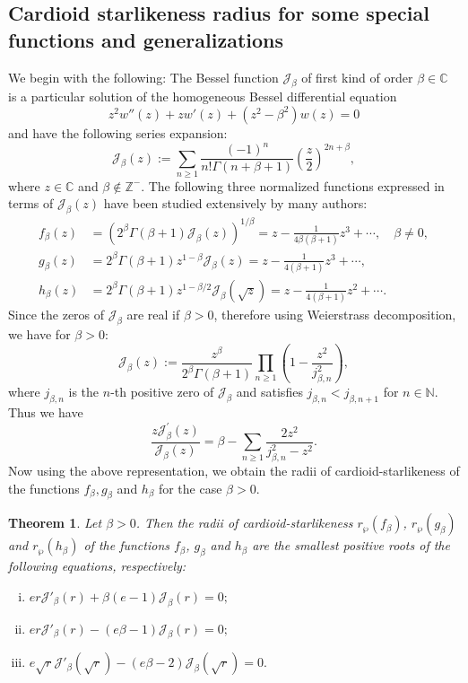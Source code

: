 \documentclass[12pt, reqno]{amsart}
\numberwithin{equation}{section}
\theoremstyle{plain}
\newtheorem{theorem}{Theorem}[section]
\theoremstyle{definition}
\theoremstyle{remark}
\begin{document}
\subsection{Cardioid starlikeness radius for some special functions and generalizations}
We begin with the following:
The Bessel function $\mathcal{J}_{\beta}$ of first kind of order $\beta\in\mathbb{C}$ is a particular solution of the homogeneous Bessel differential equation $$z^2w''(z)+zw'(z)+(z^2-{\beta}^2)w(z)=0$$ and have the following series expansion:
\begin{equation*}
\mathcal{J}_{\beta}(z):= \sum_{n\geq1}\frac{(-1)^n}{n!\Gamma(n+\beta+1)}\left(\frac{z}{2}\right)^{2n+\beta},
\end{equation*}
where $z\in\mathbb{C}$ and $\beta\not\in \mathbb{Z}^{-}$. The following three normalized functions expressed in terms of $\mathcal{J}_{\beta}(z)$ have been studied extensively by many authors:
\begin{align}\label{fb}
f_{\beta}(z)&=(2^{\beta}\Gamma(\beta+1)\mathcal{J}_{\beta}(z))^{1/\beta}=z-\frac{1}{4\beta(\beta+1)}z^3+\cdots, \quad \beta\neq0,
\nonumber\\
g_{\beta}(z)&=2^{\beta}\Gamma(\beta+1)z^{1-\beta}\mathcal{J}_{\beta}(z)=z-\frac{1}{4(\beta+1)}z^3+\cdots,\nonumber\\
h_{\beta}(z)&=2^{\beta}\Gamma(\beta+1)z^{1-\beta/2}\mathcal{J}_{\beta}(\sqrt{z})=z-\frac{1}{4(\beta+1)}z^2+\cdots.
\end{align}
Since the zeros of $\mathcal{J}_{\beta}$ are real if $\beta>0$, therefore using Weierstrass decomposition, we have for $\beta>0$:
\begin{equation*}
\mathcal{J}_{\beta}(z):=\frac{z^{\beta}}{2^{\beta}\Gamma(\beta+1)}\prod_{n\geq1}\left(1-\frac{z^2}{j^2_{\beta,n}}\right),
\end{equation*}
where $j_{\beta,n}$ is the $n$-th positive zero of $\mathcal{J}_{\beta}$ and satisfies $j_{\beta,n}<j_{\beta,n+1}$ for $n\in\mathbb{N}$. Thus we have
\begin{equation}\label{besel-rep}
\frac{z\mathcal{J}^{'}_{\beta}(z)}{\mathcal{J}_{\beta}(z)}=\beta-\sum_{n\geq1}\frac{2z^2}{j^2_{\beta,n}-z^2}.
\end{equation}
Now using the above representation, we obtain the radii of cardioid-starlikeness of the functions $f_{\beta}, g_{\beta}$ and $h_{\beta}$ for the case $\beta>0$.

\begin{theorem}\label{3}
	Let $\beta>0$. Then the radii of cardioid-starlikeness $r_{\wp}(f_{\beta})$, $r_{\wp}(g_{\beta})$ and $r_{\wp}(h_{\beta})$ of the functions $f_{\beta}$, $g_{\beta}$ and $h_{\beta}$ are the smallest positive roots of the following equations, respectively:
	\begin{enumerate}[(i)]
		\item $er\mathcal{J}'_{\beta}(r)+\beta(e-1)\mathcal{J}_{\beta}(r)=0;$
		\item $er\mathcal{J}'_{\beta}(r)-(e\beta-1)\mathcal{J}_{\beta}(r)=0;$
		\item $e\sqrt{r}\mathcal{J}'_{\beta}(\sqrt{r})-(e\beta-2)\mathcal{J}_{\beta}(\sqrt{r})=0.$
	\end{enumerate}	
\end{theorem}
\end{document}
